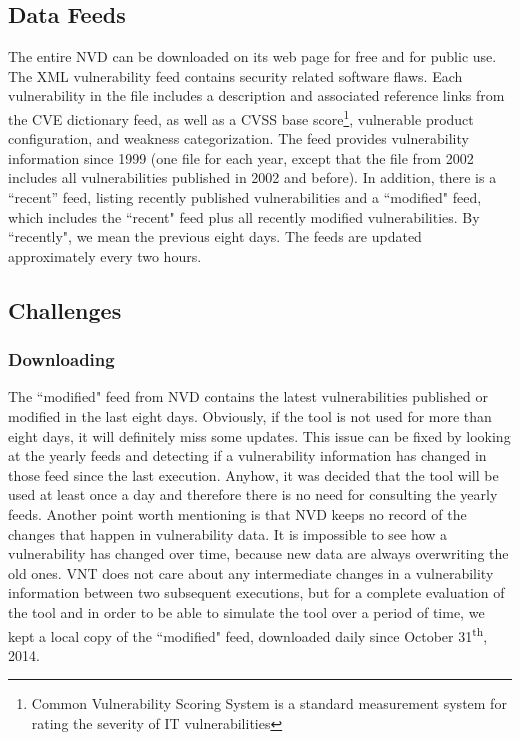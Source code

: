 \subsection{Data Feeds}
The entire NVD can be downloaded on its web page for free and for public use. The XML vulnerability feed contains security related software flaws. Each vulnerability in the file includes a description and associated reference links from the CVE dictionary feed, as well as a CVSS base score\footnote{Common Vulnerability Scoring System is a standard measurement system for rating the severity of IT vulnerabilities}, vulnerable product configuration, and weakness categorization. The feed provides vulnerability information since 1999 (one file for each year, except that the file from 2002 includes all vulnerabilities published in 2002 and before). In addition, there is a ``recent'' feed, listing recently published vulnerabilities and a ``modified" feed, which includes the ``recent" feed plus all recently modified vulnerabilities. By ``recently", we mean the previous eight days. The feeds are updated approximately every two hours.


\subsection{Challenges}
\subsubsection{Downloading}
The ``modified" feed from NVD contains the latest vulnerabilities published or modified in the last eight days. Obviously, if the tool is not used for more than eight days, it will definitely miss some updates. This issue can be fixed by looking at the yearly feeds and detecting if a vulnerability information has changed in those feed since the last execution. Anyhow, it was decided that the tool will be used at least once a day and therefore there is no need for consulting the yearly feeds. 
Another point worth mentioning is that NVD keeps no record of the changes that happen in vulnerability data. It is impossible to see how a vulnerability has changed over time, because new data are always overwriting the old ones. VNT does not care about any intermediate changes in a vulnerability information between two subsequent executions, but for a complete evaluation of the tool and in order to be able to simulate the tool over a period of time, we kept a local copy of the ``modified" feed, downloaded daily since October 31\textsuperscript{th}, 2014. 

